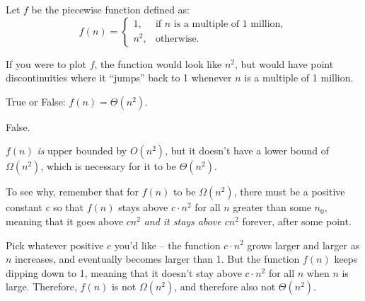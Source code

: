 \begin{prob}
    Let $f$ be the piecewise function defined as:
    \[
        f(n) = \begin{cases}
            1, & \text{if $n$ is a multiple of 1 million},\\
            n^2, &\text{otherwise}.
        \end{cases}
    \]

    If you were to plot $f$, the function would look like $n^2$, but would have point
    discontinuities where it ``jumps'' back to 1 whenever $n$ is a multiple of
    1 million.

    True or False: $f(n) = \Theta(n^2)$.

    \tF{}

    \begin{soln}
        False.

        $f(n)$ \textit{is} upper bounded by $O(n^2)$, but it doesn't have a
        lower bound of $\Omega(n^2)$, which is necessary for it to be
        $\Theta(n^2)$.

        To see why, remember that for $f(n)$ to be $\Omega(n^2)$, there must be
        a positive constant $c$ so that $f(n)$ stays above $c\cdot n^2$ for all
        $n$ greater than some $n_0$, meaning that it goes above $c n^2$
        \textit{and it stays above $c n^2$} forever, after some point.

        Pick whatever positive $c$ you'd like -- the function $c\cdot n^2$
        grows larger and larger as $n$ increases, and eventually becomes larger
        than 1. But the function $f(n)$ keeps dipping down to 1, meaning that
        it doesn't stay above $c\cdot n^2$ for all $n$ when $n$ is large.
        Therefore, $f(n)$ is not $\Omega(n^2)$, and therefore also not
        $\Theta(n^2)$.
    \end{soln}

\end{prob}
